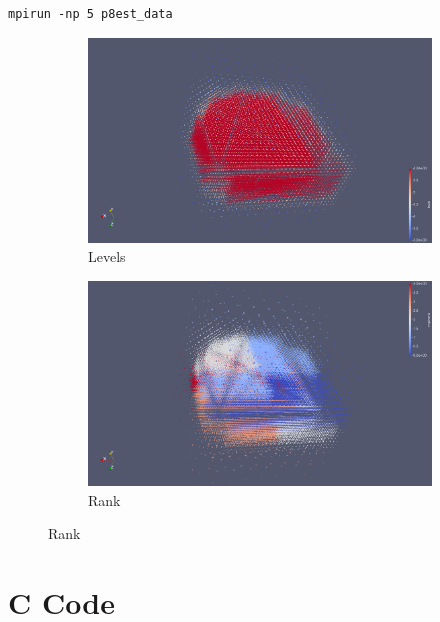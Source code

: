 \documentclass[12pt,letterpaper]{article}
\begin{document}
\begin{verbatim}
mpirun -np 5 p8est_data
\end{verbatim}

\begin{figure}[ht]
\centering
\caption{Octree}
\label{octree}
\begin{subfigure}[b]{0.45\textwidth}
\caption{Levels}
\label{oct_levels}
\includegraphics[width=\textwidth]{oct_level.png}
\end{subfigure}
\begin{subfigure}[b]{0.45\textwidth}
\caption{Rank}
\label{oct_rank}
\includegraphics[width=\textwidth]{oct_rank.png}
\end{subfigure}
\end{figure}

\section{C Code}


\end{document}
